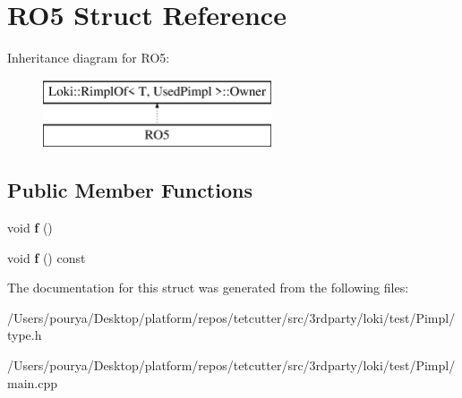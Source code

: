 \hypertarget{structRO5}{}\section{R\+O5 Struct Reference}
\label{structRO5}
Inheritance diagram for R\+O5\+:\begin{figure}[H]
\begin{center}
\leavevmode
\includegraphics[height=2.000000cm]{structRO5}
\end{center}
\end{figure}
\subsection*{Public Member Functions}
\begin{DoxyCompactItemize}
\item 
\hypertarget{structRO5_a3e6b04347cbef805e6f5fc66ae284a40}{}void {\bfseries f} ()\label{structRO5_a3e6b04347cbef805e6f5fc66ae284a40}

\item 
\hypertarget{structRO5_a336aeabe611e25623c877b4bda83c451}{}void {\bfseries f} () const \label{structRO5_a336aeabe611e25623c877b4bda83c451}

\end{DoxyCompactItemize}


The documentation for this struct was generated from the following files\+:\begin{DoxyCompactItemize}
\item 
/\+Users/pourya/\+Desktop/platform/repos/tetcutter/src/3rdparty/loki/test/\+Pimpl/type.\+h\item 
/\+Users/pourya/\+Desktop/platform/repos/tetcutter/src/3rdparty/loki/test/\+Pimpl/main.\+cpp\end{DoxyCompactItemize}
